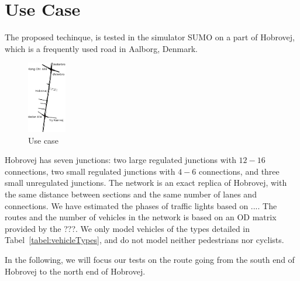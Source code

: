 \section{Use Case}
The proposed techinque, \tech is tested in the simulator SUMO on a part of Hobrovej, which is a frequently used road in Aalborg, Denmark.

\begin{figure}[htb]
\centering
\includegraphics[width=0.15\textwidth]{images/Hobrovej.png}
\caption{Use case}
\label{fig:Introduction:hobro}
\end{figure}

Hobrovej has seven junctions: two large regulated junctions with $12-16$ connections, two small regulated junctions with $4-6$ connections, and three small unregulated junctions.
The network is an exact replica of Hobrovej, with the same distance between sections and the same number of lanes and connections. 
We have estimated the phases of traffic lights based on ....%
The routes and the number of vehicles in the network is based on an OD matrix provided by the ???.
We only model vehicles of the types detailed in Tabel~\ref{tabel:vehicleTypes}, and do not model neither pedestrians nor cyclists.

In the following, we will focus our tests on the route going from the south end of Hobrovej to the north end of Hobrovej. 
